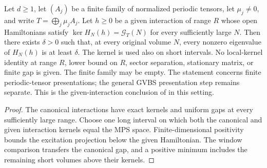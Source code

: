 \begin{lemma}
    \label{thm:periodic_family_given_interaction_uniform_open_gap}
    \leanok
    Let $d\ge1$, let $(A_j)$ be a finite family of normalized periodic
    tensors, let $\mu_j\ne0$, and write $T=\bigoplus_j\mu_jA_j$.
    Let $h\ge0$ be a given interaction of range $R$ whose open
    Hamiltonians satisfy $\ker H_N(h)=\mathcal G_T(N)$ for every
    sufficiently large $N$.
    Then there exists $\delta>0$ such that, at every original volume $N$,
    every nonzero eigenvalue of $H_N(h)$ is at least $\delta$.
    The kernel is used also on short intervals. No local-kernel
    identity at range $R$, lower bound on $R$, sector
    separation, stationary matrix, or finite gap is given.
    The finite family may be empty. The statement concerns finite
    periodic-tensor presentations; the general GVBS presentation step
    remains separate. This is the given-interaction conclusion of
    \cite[Theorem~1.2]{Nachtergaele1996Spectral} in this setting.
\end{lemma}
\begin{proof}\leanok
    The canonical interactions have exact kernels and uniform gaps at
    every sufficiently large range. Choose one long interval on which
    both the canonical and given interaction kernels equal the MPS
    space. Finite-dimensional positivity bounds the excitation projection
    below the given Hamiltonian. The window comparison transfers the
    canonical gap, and a positive minimum includes the remaining short
    volumes above their kernels.
\end{proof}

